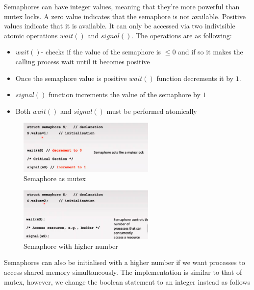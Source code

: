 \documentclass[a4paper]{article}
\theoremstyle{plain}
\theoremstyle{definition}
\newtheorem{defn}{Definition}[section]
\theoremstyle{remark}
\begin{document}
\begin{tcolorbox}[colback=black!3!white,colframe=black!60!white,title=\begin{defn}Semaphores \label{Semaphores}\end{defn}]
Semaphores can have integer values, meaning that they're more powerful than mutex locks. A zero value indicates that the semaphore is not available. Positive values indicate that it is available. It can only be accessed via two indivisible atomic operations $wait\left(  \right) $ and $signal\left(  \right) $.
The operations are as following:
\begin{itemize}
	\item $wait\left(  \right) $- checks if the value of the semaphore is $\le 0$ and if so it makes the calling process wait until it becomes positive
	\item Once the semaphore value is positive $wait\left(  \right) $ function decrements it by $1$.
	\item $signal\left(  \right) $ function increments the value of the semaphore by $1$ 
	\item Both $wait\left(  \right) $ and $signal\left(  \right) $ must be performed atomically
\end{itemize}
\begin{figure}[H]
	\centering
	\includegraphics[width=0.6\textwidth]{fourtyseven.png}
	\caption{Semaphore as mutex}
	\label{fig:fourtyseven-png}
\end{figure}
\begin{figure}[H]
	\centering
	\includegraphics[width=0.6\textwidth]{fourtyeight.png}
	\caption{Semaphore with higher number}
	\label{fig:fourtyeight-png}
\end{figure}
Semaphores can also be initialised with a higher number if we want processes to access shared memory simultaneously. The implementation is similar to that of mutex, however, we change the boolean statement to an integer instead as follows

\end{tcolorbox}
\end{document}

